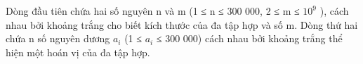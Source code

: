 Dòng đầu tiên chứa hai số nguyên n và m (1 ≤ n ≤ 300 000, 2 ≤ m ≤ $10^{9}$   ), cách nhau bởi khoảng trắng cho biết kích thước của đa tập hợp và số m. Dòng thứ hai chứa n số nguyên dương $a_{i}$   (1 ≤ $a_{i}$   ≤ 300 000) cách nhau bởi khoảng trắng thể hiện một hoán vị của đa tập hợp.